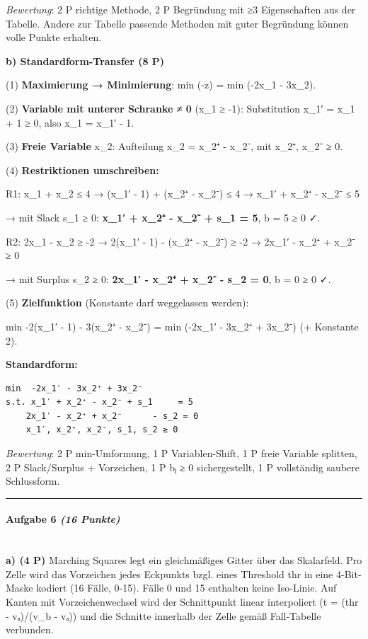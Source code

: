 \documentclass[11pt, a4paper]{article}
\begin{document}
\textit{Bewertung}: 2 P richtige Methode, 2 P Begründung mit ≥3 Eigenschaften aus der Tabelle. Andere zur Tabelle passende Methoden mit guter Begründung können volle Punkte erhalten.


\textbf{b) Standardform-Transfer (8 P)}


(1) \textbf{Maximierung → Minimierung}: min (-z) = min (-2x\_1 - 3x\_2).


(2) \textbf{Variable mit unterer Schranke ≠ 0} (x\_1 ≥ -1): Substitution x\_1′ = x\_1 + 1 ≥ 0, also x\_1 = x\_1′ - 1.


(3) \textbf{Freie Variable} x\_2: Aufteilung x\_2 = x\_2⁺ - x\_2⁻, mit x\_2⁺, x\_2⁻ ≥ 0.


(4) \textbf{Restriktionen umschreiben:}


R1: x\_1 + x\_2 ≤ 4 → (x\_1′ - 1) + (x\_2⁺ - x\_2⁻) ≤ 4 → x\_1′ + x\_2⁺ - x\_2⁻ ≤ 5

→ mit Slack s\_1 ≥ 0: \textbf{x\_1′ + x\_2⁺ - x\_2⁻ + s\_1 = 5}, b = 5 ≥ 0 ✓.


R2: 2x\_1 - x\_2 ≥ -2 → 2(x\_1′ - 1) - (x\_2⁺ - x\_2⁻) ≥ -2 → 2x\_1′ - x\_2⁺ + x\_2⁻ ≥ 0

→ mit Surplus s\_2 ≥ 0: \textbf{2x\_1′ - x\_2⁺ + x\_2⁻ - s\_2 = 0}, b = 0 ≥ 0 ✓.


(5) \textbf{Zielfunktion} (Konstante darf weggelassen werden):

min -2(x\_1′ - 1) - 3(x\_2⁺ - x\_2⁻) = min (-2x\_1′ - 3x\_2⁺ + 3x\_2⁻) (+ Konstante 2).


\textbf{Standardform:}

\begin{lstlisting}
min  -2x_1′ - 3x_2⁺ + 3x_2⁻
s.t. x_1′ + x_2⁺ - x_2⁻ + s_1     = 5
    2x_1′ - x_2⁺ + x_2⁻      - s_2 = 0
    x_1′, x_2⁺, x_2⁻, s_1, s_2 ≥ 0
\end{lstlisting}


\textit{Bewertung}: 2 P min-Umformung, 1 P Variablen-Shift, 1 P freie Variable splitten, 2 P Slack/Surplus + Vorzeichen, 1 P bⱼ ≥ 0 sichergestellt, 1 P vollständig saubere Schlussform.



\noindent\textcolor{rulegray}{\rule{\linewidth}{0.4pt}}


\paragraph{Aufgabe 6 \textit{(16 Punkte)}}\mbox{}\\[2pt]

\textbf{a) (4 P)} Marching Squares legt ein gleichmäßiges Gitter über das Skalarfeld. Pro Zelle wird das Vorzeichen jedes Eckpunkts bzgl. eines Threshold thr in eine 4-Bit-Maske kodiert (16 Fälle, 0-15). Fälle 0 und 15 enthalten keine Iso-Linie. Auf Kanten mit Vorzeichenwechsel wird der Schnittpunkt linear interpoliert (t = (thr - vₐ)/(v\_b - vₐ)) und die Schnitte innerhalb der Zelle gemäß Fall-Tabelle verbunden.
\end{document}
